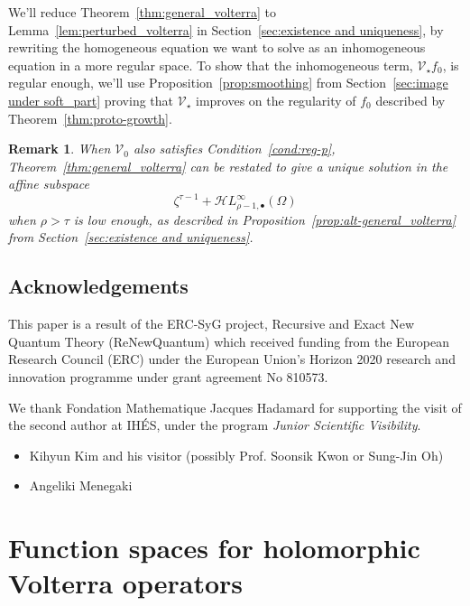 \documentclass{article}
\theoremstyle{plain}
\newtheorem{rmk}{Remark}
\newcommand{\singexp}[2]{\mathcal{H}L^\infty_{#1, #2}}
\newcommand{\singexpalg}[1]{\singexp{#1}{\bullet}}
\newcommand{\hardpart}{\mathcal{V}_0}
\newcommand{\softpart}{\mathcal{V}_\star}
\newcommand{\domain}{\Omega}
\newenvironment{brainstorm}{\color{violet}\begin{itemize}}{\end{itemize}\color{black}}
\begin{document}
We'll reduce Theorem~\ref{thm:general_volterra} to Lemma~\ref{lem:perturbed_volterra} in Section~\ref{sec:existence and uniqueness}, by rewriting the homogeneous equation we want to solve as an inhomogeneous equation in a more regular space. To show that the inhomogeneous term, $\softpart f_0$, is regular enough, we'll use Proposition~\ref{prop:smoothing} from Section~\ref{sec:image under soft_part} proving that $\softpart$ improves on the regularity of $f_0$ described by Theorem~\ref{thm:proto-growth}.

\begin{rmk}
When $\hardpart$ also satisfies Condition~\eqref{cond:reg-p}, Theorem~\ref{thm:general_volterra} can be restated to give a unique solution in the affine subspace
\[ \zeta^{\tau-1} + \singexpalg{\rho-1}(\domain) \]
when $\rho > \tau$ is low enough, as described in Proposition~\ref{prop:alt-general_volterra} from Section~\ref{sec:existence and uniqueness}.
\end{rmk}

\subsection{Acknowledgements}

This paper is a result of the ERC-SyG project, Recursive and Exact New Quantum Theory (ReNewQuantum) which received funding from the European Research Council (ERC) under the European Union's Horizon 2020 research and innovation programme under grant agreement No 810573. 

We thank Fondation Mathematique Jacques Hadamard for supporting the visit of the second author at IH\'ES, under the program \textit{Junior Scientific Visibility}.
\begin{brainstorm}
\item Kihyun Kim and his visitor (possibly Prof. Soonsik Kwon or Sung-Jin Oh)
\item Angeliki Menegaki
\end{brainstorm}
\section{Function spaces for holomorphic Volterra operators}\label{fn-spaces}
\end{document}
